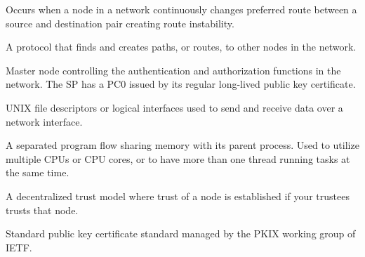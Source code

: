 \begin{acronym}
	Occurs when a node in a network continuously changes preferred route between a
	source and destination pair creating route instability.


	A protocol that finds and creates paths, or routes, to other nodes in the
	network.

	Master node controlling the authentication and authorization functions in
	the network. The SP has a PC0 issued by its regular long-lived public key
	certificate.


	UNIX file descriptors or logical interfaces used to send and receive data over
	a network interface.

	A separated program flow sharing memory with its parent process. Used to
	utilize multiple CPUs or CPU cores, or to have more than one thread running
	tasks at the same time.

	A decentralized trust model where trust of a node is established if your
	trustees trusts that node.

	Standard public key certificate standard managed by the PKIX working group of
	IETF.

\end{acronym}

